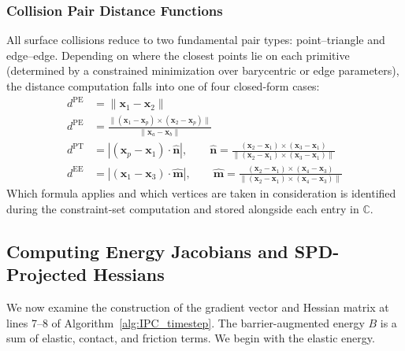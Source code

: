 \documentclass{article}
\begin{document}
\subsubsection{Collision Pair Distance Functions}

All surface collisions reduce to two fundamental pair types: point--triangle and edge--edge. Depending on where the closest points lie on each primitive (determined by a constrained minimization over barycentric or edge parameters), the distance computation falls into one of four closed-form cases:
\begin{align}
    d^{\text{PE}}
        &= \|\mathbf{x}_1 - \mathbf{x}_2\| \\[1ex]
    d^{\text{PE}}
        &= \frac{
            \|(\mathbf{x}_1 - \mathbf{x}_p)
              \times
             (\mathbf{x}_2 - \mathbf{x}_p)\|
           }{
            \|\mathbf{x}_a - \mathbf{x}_b\|
           } \\[1ex]
    d^{\text{PT}}
        &= \left|
            (\mathbf{x}_p - \mathbf{x}_1) \cdot \hat{\mathbf{n}}
           \right|, \qquad
    \hat{\mathbf{n}}
        = \frac{
            (\mathbf{x}_2 - \mathbf{x}_1)
            \times
            (\mathbf{x}_3 - \mathbf{x}_1)
          }{
            \|(\mathbf{x}_2 - \mathbf{x}_1)
            \times
            (\mathbf{x}_3 - \mathbf{x}_1)\|
          } \\[1ex]
    d^{\text{EE}}
        &= \left|
            (\mathbf{x}_1 - \mathbf{x}_3) \cdot \hat{\mathbf{m}}
           \right|, \qquad
    \hat{\mathbf{m}}
        = \frac{
            (\mathbf{x}_2 - \mathbf{x}_1)
            \times
            (\mathbf{x}_4 - \mathbf{x}_3)
          }{
            \|(\mathbf{x}_2 - \mathbf{x}_1)
            \times
            (\mathbf{x}_4 - \mathbf{x}_3)\|
          }
\end{align}
Which formula applies and which vertices are taken in consideration is identified during the constraint-set computation and stored alongside each entry in $\mathbb{C}$.

\subsection{Computing Energy Jacobians and SPD-Projected Hessians}

We now examine the construction of the gradient vector and Hessian matrix at lines 7--8 of Algorithm~\ref{alg:IPC_timestep}. The barrier-augmented energy $B$ is a sum of elastic, contact, and friction terms. We begin with the elastic energy.
\end{document}
